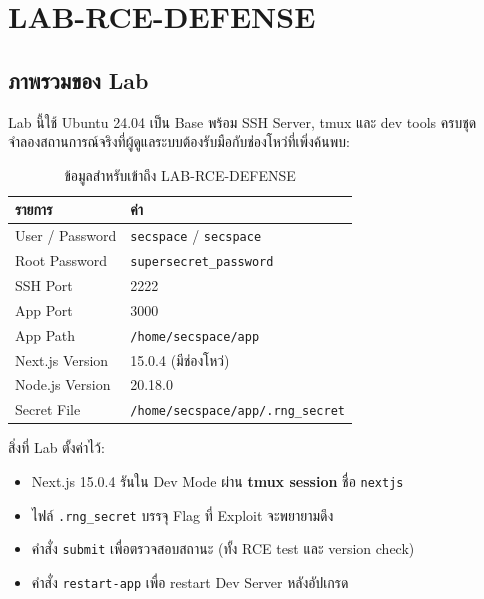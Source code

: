 \documentclass[12pt,oneside]{report}
\begin{document}
\newpage

\section{LAB-RCE-DEFENSE}

\subsection{ภาพรวมของ Lab}

Lab นี้ใช้ Ubuntu 24.04 เป็น Base พร้อม SSH Server, tmux และ dev tools ครบชุด จำลองสถานการณ์จริงที่ผู้ดูแลระบบต้องรับมือกับช่องโหว่ที่เพิ่งค้นพบ:

\begin{table}[ht]
    \centering
    \caption{ข้อมูลสำหรับเข้าถึง LAB-RCE-DEFENSE}
    \vspace{0.3cm}
    \begin{tabular}{ll}
        \toprule
        \textbf{รายการ} & \textbf{ค่า} \\
        \midrule
        User / Password & \texttt{secspace} / \texttt{secspace} \\
        Root Password & \texttt{supersecret\_password} \\
        SSH Port & 2222 \\
        App Port & 3000 \\
        App Path & \texttt{/home/secspace/app} \\
        Next.js Version & 15.0.4 (มีช่องโหว่) \\
        Node.js Version & 20.18.0 \\
        Secret File & \texttt{/home/secspace/app/.rng\_secret} \\
        \bottomrule
    \end{tabular}
    \label{tab:defense_info}
\end{table}

สิ่งที่ Lab ตั้งค่าไว้:
\begin{itemize}[leftmargin=1.5cm]
    \item Next.js 15.0.4 รันใน Dev Mode ผ่าน \textbf{tmux session} ชื่อ \texttt{nextjs}
    \item ไฟล์ \texttt{.rng\_secret} บรรจุ Flag ที่ Exploit จะพยายามดึง
    \item คำสั่ง \texttt{submit} เพื่อตรวจสอบสถานะ (ทั้ง RCE test และ version check)
    \item คำสั่ง \texttt{restart-app} เพื่อ restart Dev Server หลังอัปเกรด
\end{itemize}
\end{document}

